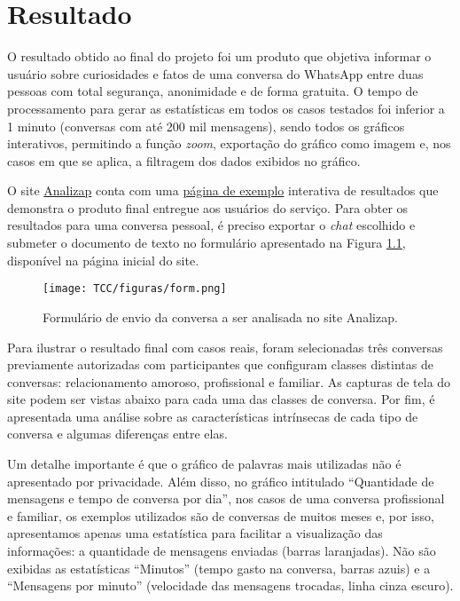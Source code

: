 \chapter{Resultado}


O resultado obtido ao final do projeto foi um produto que objetiva informar o usuário sobre curiosidades e fatos de uma conversa do WhatsApp entre duas pessoas com total segurança, anonimidade e de forma gratuita. O tempo de processamento para gerar as estatísticas em todos os casos testados foi inferior a 1 minuto (conversas com até 200 mil mensagens), sendo todos os gráficos interativos, permitindo a função \textit{zoom}, exportação do gráfico como imagem e, nos casos em que se aplica, a filtragem dos dados exibidos no gráfico.

O site \href{http://analizap.tk/}{Analizap} conta com uma \href{https://analizap.tk/exemplo}{página de exemplo} interativa de resultados que demonstra o produto final entregue aos usuários do serviço. Para obter os resultados para uma conversa pessoal, é preciso exportar o \textit{chat} escolhido e submeter o documento de texto no formulário apresentado na Figura \ref{formulario_txt}, disponível na página inicial do site.

\begin{figure}[H]
    \centering
    \texttt{[image: TCC/figuras/form.png]}
    \caption{Formulário de envio da conversa a ser analisada no site Analizap.}
    \label{formulario_txt}
\end{figure}

Para ilustrar o resultado final com casos reais, foram selecionadas três conversas previamente autorizadas com participantes que configuram classes distintas de conversas: relacionamento amoroso, profissional e familiar. As capturas de tela do site podem ser vistas abaixo para cada uma das classes de conversa. Por fim, é apresentada uma análise sobre as características intrínsecas de cada tipo de conversa e algumas diferenças entre elas.

Um detalhe importante é que o gráfico de palavras mais utilizadas não é apresentado por privacidade. Além disso, no gráfico intitulado “Quantidade de mensagens e tempo de conversa por dia”, nos casos de uma conversa profissional e familiar, os exemplos utilizados são de conversas de muitos meses e, por isso, apresentamos apenas uma estatística para facilitar a visualização das informações: a quantidade de mensagens enviadas (barras laranjadas). Não são exibidas as estatísticas “Minutos” (tempo gasto na conversa, barras azuis) e a “Mensagens por minuto” (velocidade das mensagens trocadas, linha cinza escuro).

